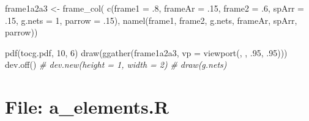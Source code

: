 \documentclass[
]{article}
\newenvironment{Shaded}{\begin{snugshade}}{\end{snugshade}}
\newcommand{\AttributeTok}[1]{\textcolor[rgb]{0.77,0.63,0.00}{#1}}
\newcommand{\CommentTok}[1]{\textcolor[rgb]{0.56,0.35,0.01}{\textit{#1}}}
\newcommand{\DecValTok}[1]{\textcolor[rgb]{0.00,0.00,0.81}{#1}}
\newcommand{\FunctionTok}[1]{\textcolor[rgb]{0.00,0.00,0.00}{#1}}
\newcommand{\NormalTok}[1]{#1}
\newcommand{\OtherTok}[1]{\textcolor[rgb]{0.56,0.35,0.01}{#1}}
\newcommand{\StringTok}[1]{\textcolor[rgb]{0.31,0.60,0.02}{#1}}
\begin{document}
\begin{Shaded}
\begin{Highlighting}[]
\NormalTok{frame1a2a3 }\OtherTok{\textless{}{-}} \FunctionTok{frame\_col}\NormalTok{(}
  \FunctionTok{c}\NormalTok{(}\AttributeTok{frame1 =}\NormalTok{ .}\DecValTok{8}\NormalTok{, }\AttributeTok{frameAr =}\NormalTok{ .}\DecValTok{15}\NormalTok{,}
    \AttributeTok{frame2 =}\NormalTok{ .}\DecValTok{6}\NormalTok{, }\AttributeTok{spArr =}\NormalTok{ .}\DecValTok{15}\NormalTok{, }\AttributeTok{g.nets =} \DecValTok{1}\NormalTok{, }\AttributeTok{parrow =}\NormalTok{ .}\DecValTok{15}\NormalTok{),}
  \FunctionTok{namel}\NormalTok{(frame1, frame2, g.nets, frameAr, spArr, parrow))}

\FunctionTok{pdf}\NormalTok{(}\StringTok{\textquotesingle{}tocg.pdf\textquotesingle{}}\NormalTok{, }\DecValTok{10}\NormalTok{, }\DecValTok{6}\NormalTok{)}
\FunctionTok{draw}\NormalTok{(}\FunctionTok{ggather}\NormalTok{(frame1a2a3, }\AttributeTok{vp =} \FunctionTok{viewport}\NormalTok{(, , .}\DecValTok{95}\NormalTok{, .}\DecValTok{95}\NormalTok{)))}
\FunctionTok{dev.off}\NormalTok{()}
\CommentTok{\# dev.new(height = 1, width = 2)}
\CommentTok{\# draw(g.nets)}
\end{Highlighting}
\end{Shaded}

\hypertarget{file-a_elements.r}{%
\section{File: a\_elements.R}\label{file-a_elements.r}}
\end{document}
